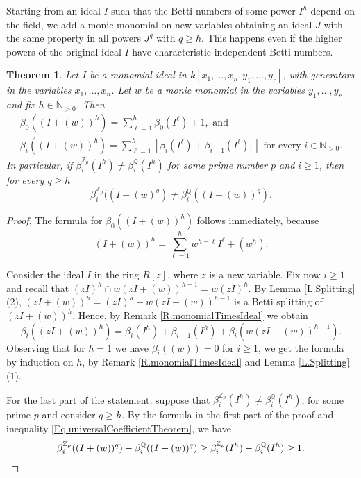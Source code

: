 \documentclass[11pt,oneside]{amsart}
\theoremstyle{plain}
\newtheorem{theorem}{Theorem}[section]
\theoremstyle{definition}
\newcommand{\Q}{\mathbb{Q}}
\newcommand{\Z}{\mathbb{Z}}
\begin{document}
Starting from an ideal $I$ such that the Betti numbers of some power $I^h$ depend on the field, we add a monic monomial on new variables obtaining an ideal $J$ with the same property in all powers $J^q$ with $q \geq h$. This happens even if the higher powers of the original ideal $I$ have characteristic independent Betti numbers.


\begin{theorem}\label{T.Formula}
Let $I$ be a monomial ideal in $k[x_1,\dots,x_n,y_1,\dots,y_r]$, with generators in the variables $x_1,\dots,x_n$. Let $w$ be a monic monomial in the variables $y_1,\dots,y_r$ and fix $h \in \mathbb{N}_{>0}$. Then 
\begin{gather*}
\beta_{0}((I +(w))^h)=\sum_{\ell=1}^h \beta_{0}(I^{\ell})+1, \text{ and} \\
\beta_{i}((I +(w))^h)=\sum_{\ell=1}^h \left[\beta_{i}(I^{\ell})+\beta_{i-1}(I^{\ell}), \right] \text{    for every   } i \in \mathbb{N}_{>0}. \end{gather*}
In particular, if $\beta_i^{\Z_p}(I^h) \neq \beta_i^\Q(I^h)$ for some prime number $p$ and $i \geq 1$, then for every $q \geq h$
\[
\beta_i^{\Z_p}((I +(w)^q) \neq \beta_i^\Q((I +(w))^q).
\]
\end{theorem}

\begin{proof}
The formula for $\beta_{0}((I +(w))^h)$ follows immediately, because 
\[ 
(I +(w))^h=\sum_{\ell=1}^h w^{h-\ell}I^{\ell}+(w^h).
\]

Consider the ideal $I$ in the ring $R[z]$, where $z$ is a new variable. Fix now $i \geq 1$ and recall that $(zI)^h \cap w(zI +(w))^{h-1}=w(zI)^h$. By Lemma \ref{L.Splitting}(2), $(zI +(w))^h=(zI)^h+w(zI +(w))^{h-1}$ is a Betti splitting of $(zI +(w))^h$. Hence, by Remark \ref{R.monomialTimesIdeal} we obtain 
\[
\beta_{i}((zI +(w))^h)=\beta_{i}(I^h)+\beta_{i-1}(I^h)+\beta_{i}(w(zI +(w))^{h-1}).
\]
Observing that for $h=1$ we have $\beta_{i}((w))=0$ for $i \geq 1$, we get the formula by induction on $h$, by Remark \ref{R.monomialTimesIdeal} and Lemma \ref{L.Splitting}(1).

For the last part of the statement, suppose that $\beta^{\mathbb{Z}_p}_{i}(I^h) \neq \beta^{\mathbb{Q}}_{i}(I^h)$, for some prime $p$ and consider $q \geq h$. By the formula in the first part of the proof and inequality \eqref{Eq.universalCoefficientTheorem}, we have
\[
\beta_{i}^{\mathbb{Z}_p}((I+(w))^{q})-\beta_{i}^{\mathbb{Q}}((I +(w))^{q}) \geq \beta^{\mathbb{Z}_p}_{i}(I^h)-\beta^{\mathbb{Q}}_{i}(I^h) \geq 1. \qedhere 
\]
\end{proof}
\end{document}

